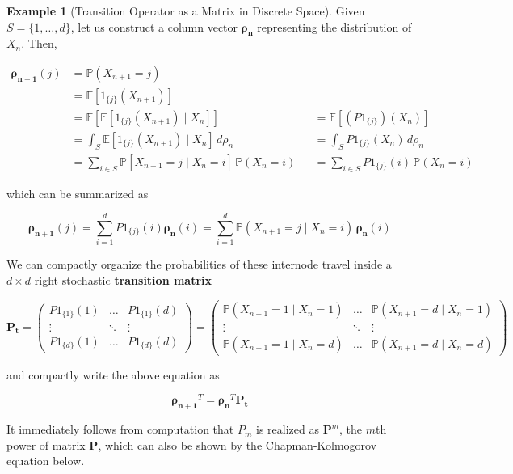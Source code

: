 \documentclass{article}
\theoremstyle{definition}
\newtheorem{example}{Example}[section]
\theoremstyle{remark}
\theoremstyle{definition}
\begin{document}
  \begin{example}[Transition Operator as a Matrix in Discrete Space]
    Given $S = \{1, \ldots, d\}$, let us construct a column vector $\boldsymbol{\rho_n}$ representing the distribution of $X_n$. Then, 

    \begin{align*}
      \boldsymbol{\rho_{n+1}} (j) & = \mathbb{P}(X_{n + 1} = j) \\
      & =  \mathbb{E}[1_{\{j\}} (X_{n+1})] \\
      & = \mathbb{E} [ \mathbb{E}[1_{\{j\}} (X_{n+1}) \mid X_n] ] && = \mathbb{E}[(P 1_{\{j\}}) (X_n)] \\
      & = \int_S \mathbb{E}[1_{\{j\}} (X_{n+1}) \mid X_n] \, d\rho_n && = \int_S P 1_{\{j\}} (X_n) \, d\rho_n \\
      & = \sum_{i \in S} \mathbb{P}[ X_{n+1} = j \mid X_n = i] \, \mathbb{P}(X_n = i) && = \sum_{i \in S} P 1_{\{j\}} (i) \, \mathbb{P}(X_n = i) 
    \end{align*}

    which can be summarized as 

    \[\boldsymbol{\rho_{n + 1}} (j) = \sum_{i = 1}^d P 1_{\{j\}} (i) \boldsymbol{\rho_n} (i) = \sum_{i = 1}^d \mathbb{P}(X_{n+1} = j \mid X_n = i) \, \boldsymbol{\rho_n} (i)\]

    We can compactly organize the probabilities of these internode travel inside a $d \times d$ right stochastic \textbf{transition matrix}

      \[\mathbf{P_t} = \begin{pmatrix} P 1_{\{1\}} (1) & \ldots & P 1_{\{1\}} (d) \\ \vdots & \ddots & \vdots \\ P 1_{\{d\}} (1) & \ldots & P 1_{\{d\}} (d) \end{pmatrix} = \begin{pmatrix} \mathbb{P}(X_{n+1} = 1 \mid X_n = 1) & \ldots & \mathbb{P}(X_{n+1} = d \mid X_n = 1) \\ \vdots & \ddots & \vdots \\ \mathbb{P}(X_{n+1} = 1 \mid X_n = d) & \ldots & \mathbb{P}(X_{n+1} = d \mid X_n = d) \end{pmatrix} \]

    and compactly write the above equation as 

      \[\boldsymbol{\rho_{n + 1}}^T = \boldsymbol{\rho_{n}}^T \mathbf{P_t}\]

    It immediately follows from computation that $P_m$ is realized as $\mathbf{P}^m$, the $m$th power of matrix $\mathbf{P}$, which can also be shown by the Chapman-Kolmogorov equation below. 
  \end{example}
\end{document}
